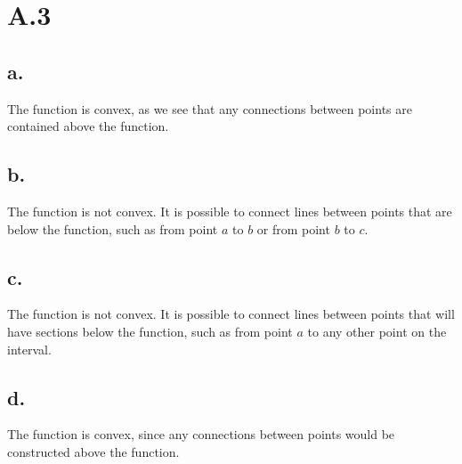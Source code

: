\documentclass{article}
\newcommand{\1}{\mathbf{1}}
\begin{document}
\section*{A.3}
{\Large 

\subsection*{a.}

The function is convex, as we see that any connections between points are contained above the function.

\subsection*{b.}

The function is not convex. It is possible to connect lines between points that are below the function, such as from point $a$ to $b$ or from point $b$ to $c$.

\subsection*{c.}

The function is not convex. It is possible to connect lines between points that will have sections below the function, such as from point $a$ to any other point on the interval.

\subsection*{d.}

The function is convex, since any connections between points would be constructed above the function.

\newpage

}
\end{document}
